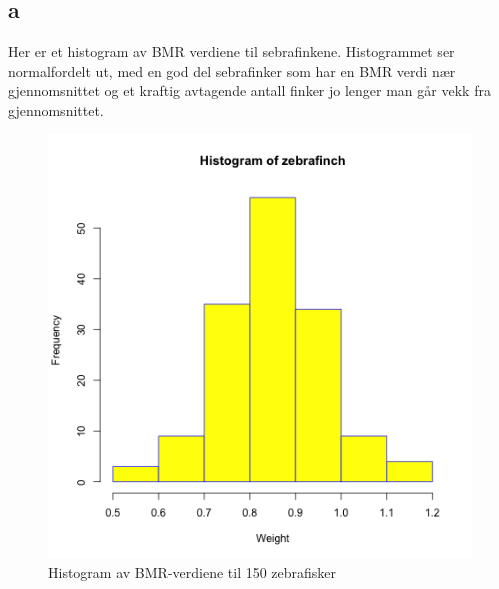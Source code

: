 

\maketitle
\newpage



\section{}%

\subsection*{a}
Her er et histogram av BMR verdiene til sebrafinkene. Histogrammet ser normalfordelt ut, med en god del sebrafinker som har en BMR verdi nær gjennomsnittet og et kraftig avtagende antall finker jo lenger man går vekk fra gjennomsnittet. 
\begin{figure}[H]
		\centering
		\includegraphics[width=0.9\linewidth]{zebrafish.pdf}
		\caption{Histogram av BMR-verdiene til 150 zebrafisker}
		\label{fig:histogram}
\end{figure}


